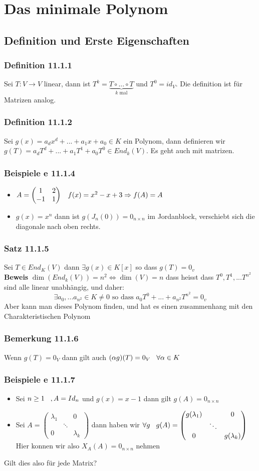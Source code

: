 \documentclass{article}
\newcommand{\smspc}{\hspace{0.3cm}}
\newcommand{\satz}[1]{\subsubsection*{Satz {#1}}}
\newcommand{\beweis}{\\\textbf{Beweis }}
\newcommand{\beispiel}[1]{\subsubsection*{Beispiele {#1}}}
\newcommand{\bemerkung}[1]{\subsubsection*{Bemerkung {#1}}}
\newcommand{\definition}[1]{\subsubsection*{Definition {#1}}}
\begin{document}
\section*{Das minimale Polynom}
\subsection*{Definition und Erste Eigenschaften}\definition{11.1.1} Sei $T:V\rightarrow V$ linear, dann ist $T^k=\underset{k\text{ mal}}{\underbrace{T\circ...\circ T}}$ und $T^0=id_V$. Die definition ist für Matrizen analog.
\definition{11.1.2} Sei $g(x)=a_dx^d+...+a_1x+a_0\in K$ ein Polynom, dann definieren wir $g(T)=a_dT^d+...+a_1T^1+a_0T^0\in End_k(V)$. Es geht auch mit matrizen.
\beispiel{e 11.1.4}
\begin{itemize}
  \item{$A=\begin{pmatrix}1&2\\-1&1\end{pmatrix}\smspc f(x)=x^2-x+3\Rightarrow f(A)=A$}
  \item{$g(x)=x^n$ dann ist $g(J_n(0))=0_{n\times n}$ im Jordanblock, verschiebt sich die diagonale nach oben rechts.}
\end{itemize}
\satz{11.1.5} Sei $T\in End_K(V)$ dann $\exists g(x)\in K[x]$ so dass $g(T)=0_v$
\beweis $\dim(End_k(V))=n^2\Leftrightarrow\dim(V)=n$ dass heisst dass $T^0,T^1,...T^{n^2}$ sind alle linear unabhängig, und daher:\[\exists a_0,...a_{n^2}\in K \neq 0\text{ so dass }a_0T^0+...+a_{n^2}T^{n^2}=0_v\]
 Aber kann man dieses Polynom finden, und hat es einen zusammenhang mit den Charakteristischen Polynom
\bemerkung{11.1.6} Wenn $g(T)=0_V$ dann gilt auch $(\alpha g)(T)=0_V\smspc \forall \alpha \in K$
\beispiel{e 11.1.7}\begin{itemize}
  \item{Sei $n\ge1\smspc, A=Id_n$ und $g(x)=x-1$ dann gilt $g(A)=0_{n\times n}$}
  \item{Sei $A=\begin{pmatrix}\lambda_1&\left.\right.&0\\\left.\right.&\ddots&\left.\right.\\0&\left.\right.&\lambda_k\end{pmatrix}$ dann haben wir
    $\forall g\smspc g(A)=\begin{pmatrix}g(\lambda_1)&\left.\right.&0\\\left.\right.&\ddots&\left.\right.\\0&\left.\right.&g(\lambda_k)\end{pmatrix}$ Hier konnen wir also $X_A(A)=0_{n\times n}$ nehmen}
\end{itemize}
Gilt dies also für jede Matrix?
\end{document}
